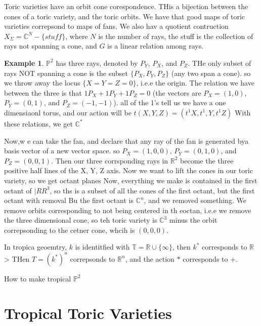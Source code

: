 \documentclass[11pt]{article}
\theoremstyle{definition}
\newtheorem{protoexample}{Example}[section]
\newenvironment{ex}
   {\begin{protoexample}}
   {\end{protoexample}}
\def\RR{{\mathbb R}}
\def\CC{{\mathbb C}}
\def\TT{{\mathbb T}}
\def\PP{{\mathbb P}}
\begin{document}


Toric varieties have an orbit cone corespondence. THis a bijection between the cones of a toric variety, and the toric orbits.  We have that good maps of toric varieties correpsond to maps of fans. We also hav a quotient contruction $X_\Sigma = \CC^N - \{stuff\}$, where $N$ is the number of rays, the stuff is the collection of rays not spanning a cone, and $G$ is a linear relation among rays.

\begin{ex}
    $\PP^2$ has three rays, denoted by $P_Y$, $P_X$, and $P_Z$. THe only subset of rays NOT spanning a cone is the subset $\{P_X, P_Y, P_Z\}$ (any two span a cone). so we throw away the locus $\{X=Y=Z=0\}$, i.e.e the origin. The relation we have between the three is that $1P_X + 1 P_Y + 1 P_Z=0$ (the vectors are $P_X=(1,0)$, $P_Y=(0,1)$, and $P_Z=(-1,-1)$). all of the 1's tell us we have a one dimensiaonl torus, and our action will be $t(X,Y,Z) = (t^1 X,t^1,Y,t^1Z)$ With these relations, we get $\CC^*$

    Now,w e can take the fan, and declare that any ray of the fan is generated bya  basis vector of a new vector space. so $P_X=(1,0,0)$, $P_Y=(0,1,0)$, and $P_Z=(0,0,1)$. Then our three corrsponding rays in $\RR^2$ become the three positive half lines of the X, Y, Z axis. Now we want to lift the cones in our toric variety, so we get octant planes Now, everything we make is contained in the first octant of $|RR^3$, so ths is a subset of all the cones of the first octant, but the first octant with removal Bu the first octant is $\CC^n$, and we removed something. We remove orbits corresponding to not being centered in th eoctan, i.e.e we remove the three dimensional cone, so teh toric variety is $\CC^3$ minus the orbit correpsonding to the cetner cone, whcih is $(0,0,0)$.
\end{ex}





In tropica geoemtry, $k $ is identitfied with $\TT= \RR \cup \{\infty\}$, then $k^*$ corresponds to $\RR$> THen $T= (k^*)^n$ correpsonds to $\RR^n$, and the action $*$ corresponds to $+$. 



How to make tropical $\PP^2$



\section{Tropical Toric Varieties}
\end{document}
